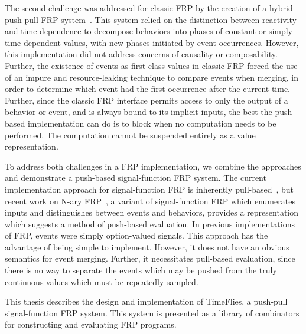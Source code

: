 The second challenge was addressed for classic FRP by the creation of a hybrid
push-pull FRP system~\cite{Elliott2009}. This system relied on the distinction
between reactivity and time dependence to decompose behaviors into phases of
constant or simply time-dependent values, with new phases initiated by event
occurrences. However, this implementation did not address concerns of causality
or composability. Further, the existence of events as first-class values in
classic FRP forced the use of an impure and resource-leaking technique to
compare events when merging, in order to determine which event had the first
occurrence after the current time. Further, since the classic FRP interface
permits access to only the output of a behavior or event, and is always bound to
its implicit inputs, the best the push-based implementation can do is to block
when no computation needs to be performed. The computation cannot be suspended
entirely as a value representation.

To address both challenges in a FRP implementation, we combine the approaches
and demonstrate a push-based signal-function FRP system. The current
implementation approach for signal-function FRP is inherently
pull-based~\cite{Nilsson2002}, but recent work on N-ary
FRP~\cite{Sculthorpe2011}, a variant of signal-function FRP which enumerates
inputs and distinguishes between events and behaviors, provides a representation
which suggests a method of push-based evaluation. In previous implementations of
FRP, events were simply option-valued signals. This approach has the advantage
of being simple to implement. However, it does not have an obvious semantics for
event merging. Further, it necessitates pull-based evaluation, since there is no
way to separate the events which may be pushed from the truly continuous values
which must be repeatedly sampled.

This thesis describes the design and implementation of TimeFlies, a push-pull signal-function FRP system. This system is presented as a library
of combinators for constructing and evaluating FRP programs.
